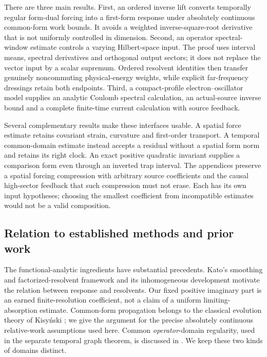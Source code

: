 \documentclass[11pt]{article}
\numberwithin{equation}{section}
\theoremstyle{definition}
\theoremstyle{remark}
\begin{document}
There are three main results. First, an ordered inverse lift converts
temporally regular form-dual forcing into a first-form response under
absolutely continuous common-form work bounds. It avoids a weighted
inverse-square-root derivative that is not uniformly controlled in
dimension. Second, an operator spectral-window estimate controls a
varying Hilbert-space input. The proof uses interval means, spectral
derivatives and orthogonal output sectors; it does not replace the
vector input by a scalar supremum. Ordered resolvent identities then
transfer genuinely noncommuting physical-energy weights, while explicit
far-frequency dressings retain both endpoints. Third, a compact-profile
electron--oscillator model supplies an analytic Coulomb spectral
calculation, an actual-source inverse bound and a complete finite-time
current calculation with source feedback.

Several complementary results make these interfaces usable. A spatial
force estimate retains covariant strain, curvature and first-order
transport. A temporal common-domain estimate instead accepts a residual
without a spatial form norm and retains its right clock. An exact
positive quadratic invariant supplies a comparison form even through
an inverted trap interval. The appendices preserve a spatial forcing
compression with arbitrary source coefficients and the causal
high-sector feedback that such compression must not erase. Each has
its own input hypotheses; choosing the smallest coefficient from
incompatible estimates would not be a valid composition.

\subsection{Relation to established methods and prior work}

The functional-analytic ingredients have substantial precedents.
Kato's smoothing and factorized-resolvent framework
\cite{Kato1966} and its inhomogeneous development
\cite{DAncona2014} motivate the relation between response and resolvents.
Our fixed positive imaginary part is an earned finite-resolution
coefficient, not a claim of a uniform limiting-absorption estimate.
Common-form propagation belongs to the classical evolution theory of
Kisy\'nski \cite{Kisynski1964}; we give the argument for the precise
absolutely continuous relative-work assumptions used here.
Common \emph{operator}-domain regularity, used in the separate temporal
graph theorem, is discussed in \cite{SchmidGriesemer2014}.
We keep these two kinds of domains distinct.
\end{document}
